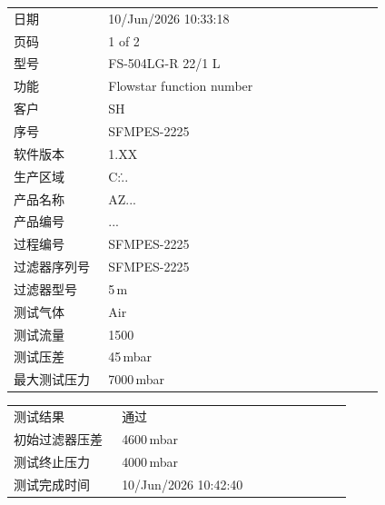 \documentclass[UTF8,10pt,a4paper,fontset=fandol]{ctexart}
\newcommand{\fieldvalue}[1]{#1}
\begin{document}
\begin{tabular}{@{}p{0.24\linewidth}p{0.70\linewidth}@{}}
日期 &
\fieldvalue{10/Jun/2026 10:33:18} \\[2pt]
页码 &
\fieldvalue{1 of 2} \\[2pt]
型号 &
\fieldvalue{FS-504LG-R 22/1 L} \\[2pt]
功能 &
\fieldvalue{Flowstar function number} \\[2pt]
客户 &
\fieldvalue{SH} \\[2pt]
序号 &
\fieldvalue{SFMPES-2225} \\[2pt]
软件版本 &
\fieldvalue{1.XX} \\[2pt]
生产区域 &
\fieldvalue{C:\Moving\...} \\[2pt]
产品名称 &
\fieldvalue{AZ...} \\[2pt]
产品编号 &
\fieldvalue{...} \\[2pt]
过程编号 &
\fieldvalue{SFMPES-2225} \\[2pt]
过滤器序列号 &
\fieldvalue{SFMPES-2225} \\[2pt]
过滤器型号 &
\fieldvalue{5\,\textmu m} \\[2pt]
测试气体 &
\fieldvalue{Air} \\[2pt]
测试流量 &
\fieldvalue{1500} \\[2pt]
测试压差 &
\fieldvalue{45\,mbar} \\[2pt]
最大测试压力 &
\fieldvalue{7000\,mbar}
\end{tabular}

\vspace{1em}

\begin{tabular}{@{}p{0.30\linewidth}p{0.64\linewidth}@{}}
测试结果 &
\fieldvalue{通过} \\[2pt]
初始过滤器压差 &
\fieldvalue{4600\,mbar} \\[2pt]
测试终止压力 &
\fieldvalue{4000\,mbar} \\[2pt]
测试完成时间 &
\fieldvalue{10/Jun/2026 10:42:40}
\end{tabular}
\end{document}
